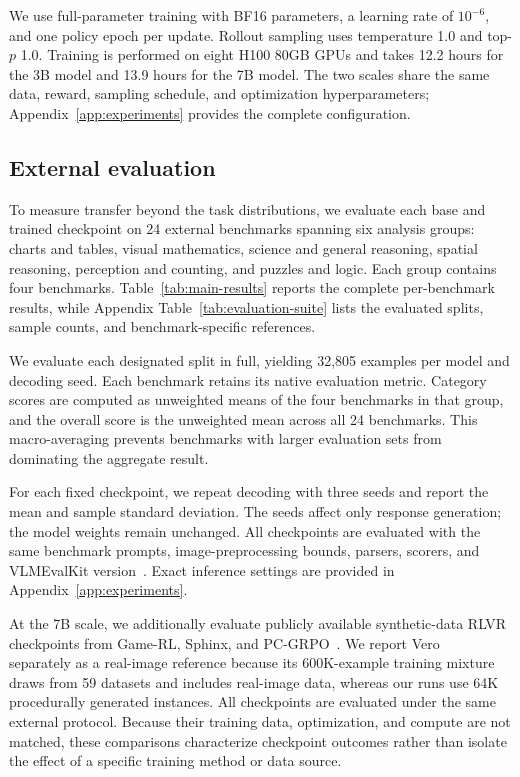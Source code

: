 We use full-parameter training with BF16 parameters, a learning rate of
$10^{-6}$, and one policy epoch per update. Rollout sampling uses temperature
1.0 and top-$p$ 1.0. Training is performed on eight H100 80GB GPUs and takes
12.2 hours for the 3B model and 13.9 hours for the 7B model. The two scales
share the same data, reward, sampling schedule, and optimization
hyperparameters; Appendix~\ref{app:experiments} provides the complete
configuration.

\subsection{External evaluation}

To measure transfer beyond the \trace task distributions, we evaluate each
base and trained checkpoint on 24 external benchmarks spanning six analysis
groups: charts and tables, visual mathematics, science and general reasoning,
spatial reasoning, perception and counting, and puzzles and logic. Each group
contains four benchmarks. Table~\ref{tab:main-results} reports the complete
per-benchmark results, while Appendix Table~\ref{tab:evaluation-suite} lists
the evaluated splits, sample counts, and benchmark-specific references.

We evaluate each designated split in full, yielding 32,805 examples per model
and decoding seed. Each benchmark retains its native evaluation metric.
Category scores are computed as unweighted means of the four benchmarks in
that group, and the overall score is the unweighted mean across all 24
benchmarks. This macro-averaging prevents benchmarks with larger evaluation
sets from dominating the aggregate result.

For each fixed checkpoint, we repeat decoding with three seeds and report the
mean and sample standard deviation. The seeds affect only response generation;
the model weights remain unchanged. All checkpoints are evaluated with the same
benchmark prompts, image-preprocessing bounds, parsers, scorers, and
VLMEvalKit version~\citep{duan2024vlmevalkit}. Exact inference settings are provided in
Appendix~\ref{app:experiments}.

At the 7B scale, we additionally evaluate publicly available synthetic-data
RLVR checkpoints from Game-RL, Sphinx, and
PC-GRPO~\citep{tong2025gamerl,alam2026sphinx,jeddi2025pcgrpo}. We report
Vero~\citep{sarch2026vero} separately as a real-image reference because its
600K-example training mixture draws from 59 datasets and includes real-image
data, whereas our runs use 64K procedurally generated instances. All
checkpoints are evaluated under the same external protocol. Because their
training data, optimization, and compute are not matched, these comparisons
characterize checkpoint outcomes rather than isolate the effect of a specific
training method or data source.
